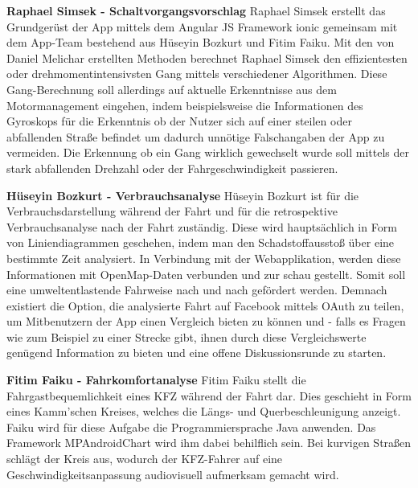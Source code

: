 	\textbf{Raphael Simsek - Schaltvorgangsvorschlag\newline}
	Raphael Simsek erstellt das Grundgerüst der App mittels dem Angular JS Framework ionic gemeinsam mit dem App-Team bestehend aus Hüseyin Bozkurt und Fitim Faiku.
	Mit den von Daniel Melichar erstellten Methoden berechnet Raphael Simsek den effizientesten oder drehmomentintensivsten Gang mittels verschiedener Algorithmen. Diese Gang-Berechnung soll allerdings auf aktuelle Erkenntnisse aus dem Motormanagement eingehen, indem beispielsweise die Informationen des Gyroskops für die Erkenntnis ob der Nutzer sich auf einer steilen oder abfallenden Straße befindet um dadurch unnötige Falschangaben der App zu vermeiden. Die Erkennung ob ein Gang wirklich gewechselt wurde soll mittels der stark abfallenden Drehzahl oder der Fahrgeschwindigkeit passieren.
	
	\textbf{Hüseyin Bozkurt - Verbrauchsanalyse\newline}
	 Hüseyin Bozkurt ist für die Verbrauchsdarstellung während der Fahrt und für die retrospektive Verbrauchsanalyse nach der Fahrt zuständig.
	 Diese wird hauptsächlich in Form von Liniendiagrammen geschehen, indem man den Schadstoffausstoß über eine bestimmte Zeit analysiert. In Verbindung mit der Webapplikation, werden diese Informationen mit OpenMap-Daten verbunden und zur schau gestellt.
	 Somit soll eine umweltentlastende Fahrweise nach und nach gefördert werden. Demnach existiert die Option, die analysierte Fahrt auf Facebook mittels OAuth zu teilen, um Mitbenutzern der App einen Vergleich bieten zu können und - falls es Fragen wie zum Beispiel zu einer Strecke gibt, ihnen durch diese Vergleichswerte genügend Information zu bieten und eine offene Diskussionsrunde zu starten.
	
	\textbf{Fitim Faiku - Fahrkomfortanalyse\newline}
	 Fitim Faiku stellt die Fahrgastbequemlichkeit eines KFZ während der Fahrt dar.
	 Dies geschieht in Form eines Kamm'schen Kreises, welches die Längs- und Querbeschleunigung anzeigt. Faiku wird für diese Aufgabe die Programmiersprache Java anwenden.
	 Das Framework MPAndroidChart wird ihm dabei behilflich sein. Bei kurvigen Straßen schlägt der Kreis aus, wodurch der KFZ-Fahrer auf eine Geschwindigkeitsanpassung audiovisuell aufmerksam gemacht wird.

